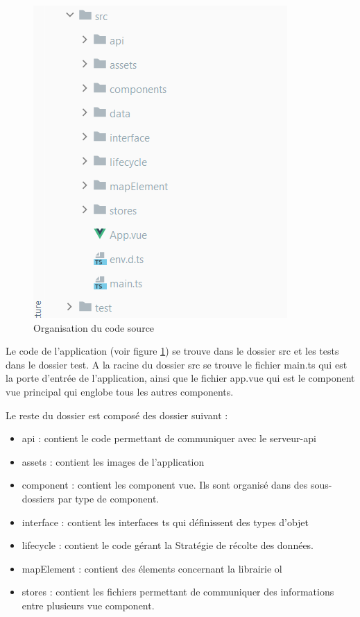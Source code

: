 \documentclass[
    iai, %
    il, %
]{heig-tb}
\begin{document}
\begin{figure}[h]
    \centering
    \includegraphics[scale=0.7]{frontend-source-organisation.png}
    \caption{Organisation du code source}
    \label{fig:fichier-source}
\end{figure}

Le code de l'application (voir figure \ref{fig:fichier-source}) se trouve dans le dossier src et les tests dans le dossier test.
A la racine du dossier src se trouve le fichier main.ts qui est la porte d'entrée de l'application,
ainsi que le fichier app.vue qui est le component vue principal qui englobe tous les autres components.

Le reste du dossier est composé des dossier suivant :
\begin{itemize}
    \item api : contient le code permettant de communiquer avec le serveur-api
    \item assets : contient les images de l'application
    \item component : contient les component vue. Ils sont organisé dans des sous-dossiers par type de component.
    \item interface : contient les interfaces \gls{ts} qui définissent des types d'objet
    \item lifecycle : contient le code gérant la Stratégie de récolte des données.
    \item mapElement : contient des élements concernant la librairie \gls{ol}
    \item stores : contient les fichiers permettant de communiquer des informations entre plusieurs vue component.
\end{itemize}
\end{document}
